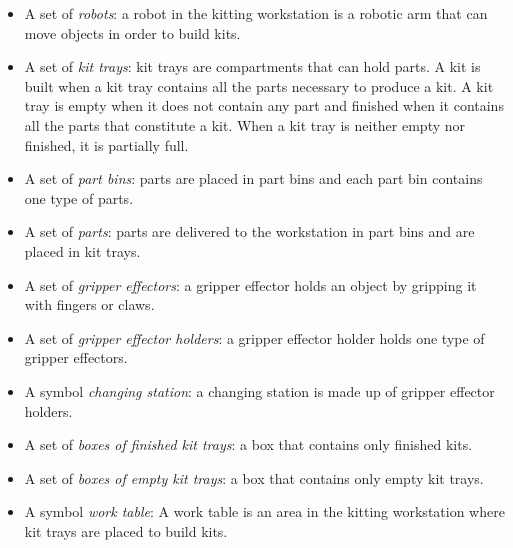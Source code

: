 \begin{itemize}
\item A set of \emph{robots}: a robot in the kitting workstation is a robotic arm that can move objects in order to build kits.

\item A set of \emph{kit trays}: kit trays are compartments that can hold parts. A kit is built when a kit tray contains all the parts necessary to produce a kit. A kit tray is empty when it does not contain any part and finished when it contains all the parts that constitute a kit. When a kit tray is neither empty nor finished, it is partially full.

\item A set of \emph{part bins}: parts are placed in part bins and each part bin contains one type of parts.

\item A set of \emph{parts}: parts are delivered to the workstation in part bins and are placed in kit trays.

\item A set of \emph{gripper effectors}: a gripper effector holds an object by gripping it with
fingers or claws.

\item A set of \emph{gripper effector holders}: a gripper effector holder holds one type of gripper effectors.

\item A symbol \emph{changing station}: a changing station is made up of gripper effector holders.

\item A set of \emph{boxes of finished kit trays}: a box that contains only finished kits.

\item A set of \emph{boxes of empty kit trays}: a box that contains only empty kit trays.

\item A symbol \emph{work table}: A work table is an area in the kitting workstation where kit trays are placed to build kits.
\end{itemize}

